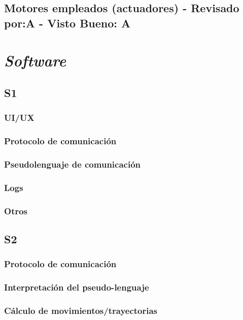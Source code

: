 \section{Motores empleados (actuadores) - Revisado por:A  - Visto Bueno: A }


\chapter{\textit{Software}}

\section{S1}

\subsection{UI/UX}

\subsection{Protocolo de comunicación}

\subsection{Pseudolenguaje de comunicación}

\subsection{Logs}

\subsection{Otros}

\section{S2}

\subsection{Protocolo de comunicación}

\subsection{Interpretación del pseudo-lenguaje}

\subsection{Cálculo de movimientos/trayectorias}

